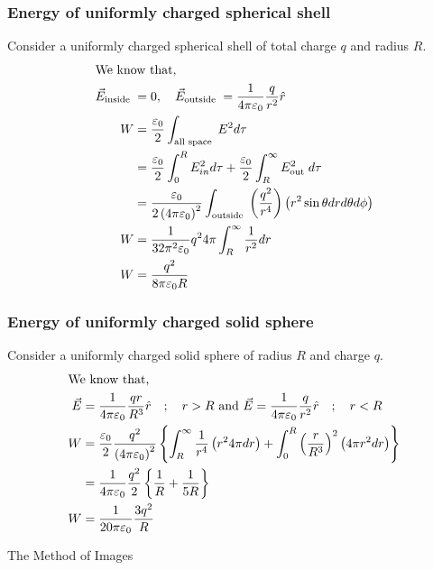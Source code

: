 \subsubsection{Energy of uniformly charged spherical shell}
Consider a uniformly charged spherical shell of total charge $q$ and radius $R$.
\begin{align*}
\intertext{We know that,}\vec{E}_{\text {inside }}&=0, \quad \vec{E}_{\text {outside }}=\frac{1}{4 \pi \varepsilon_{0}} \frac{q}{r^{2}} \hat{r}\\
W&=\frac{\varepsilon_{0}}{2} \int_{\text {all space }} E^{2} d \tau\\&=\frac{\varepsilon_{0}}{2} \int_{0}^{R} E_{i n}^{2} d \tau+\frac{\varepsilon_{0}}{2} \int_{R}^{\infty} E_{\text {out }}^{2} d \tau\\&=\frac{\varepsilon_{0}}{2\left(4 \pi \varepsilon_{0}\right)^{2}} \int_{\text {outside }}\left(\frac{q^{2}}{r^{4}}\right)\left(r^{2} \sin \theta d r d \theta d \phi\right) \\
W&=\frac{1}{32 \pi^{2} \varepsilon_{0}} q^{2} 4 \pi \int_{R}^{\infty} \frac{1}{r^{2}} d r\\ W&=\frac{q^{2}}{8 \pi \varepsilon_{0} R}
\end{align*}
\subsubsection{Energy of uniformly charged solid sphere}
Consider a uniformly charged solid sphere of radius $R$ and charge $q$.
\begin{align*}
\intertext{We know that,}
\vec{E}&=\frac{1}{4 \pi \varepsilon_{0}} \frac{q r}{R^{3}} \hat{r}\quad ; \quad r>R \text {  and  } \vec{E}=\frac{1}{4 \pi \varepsilon_{0}} \frac{q}{r^{2}} \hat{r}\quad ; \quad r<R \\
W&=\frac{\varepsilon_{0}}{2} \frac{q^{2}}{\left(4 \pi \varepsilon_{0}\right)^{2}}\left\{\int_{R}^{\infty} \frac{1}{r^{4}}\left(r^{2} 4 \pi d r\right)+\int_{0}^{R}\left(\frac{r}{R^{3}}\right)^{2}\left(4 \pi r^{2} d r\right)\right\}\\&=\frac{1}{4 \pi \varepsilon_{0}} \frac{q^{2}}{2}\left\{\frac{1}{R}+\frac{1}{5 R}\right\} \\
W&=\frac{1}{20\pi \varepsilon_{0}} \frac{3 q^{2}}{ R}
\end{align*}
\newpage 
\begin{abox}
	The Method of Images
\end{abox}
